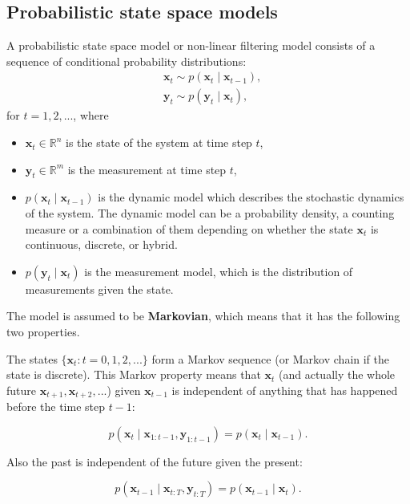 \subsection{Probabilistic state space models}
\begin{definition}
A probabilistic state space model or non-linear filtering model consists of a sequence of conditional probability distributions: 
\begin{align}
&\mathbf{x}_t \sim p(\mathbf{x}_t \mid \mathbf{x}_{t-1}), \nonumber \\
&\mathbf{y}_t \sim p(\mathbf{y}_t \mid \mathbf{x}_t),
\end{align}
for $t=1,2,...$, where 
\begin{itemize}
    \item $\mathbf{x}_t \in \mathbb{R}^n$ is the state of the system at time step $t$,
    \item $\mathbf{y}_t \in \mathbb{R}^m$ is the measurement at time step $t$, 
    \item $p(\mathbf{x}_t\mid \mathbf{x}_{t-1})$ is the dynamic model which describes the stochastic dynamics of the system. The dynamic model can be a probability density, a counting measure or a combination of them depending on whether the state $\mathbf{x}_t$ is continuous, discrete, or hybrid. 
    \item $p(\mathbf{y}_t\mid \mathbf{x}_t)$ is the measurement model, which is the distribution of measurements given the state. 
\end{itemize}
The model is assumed to be \textbf{Markovian}, which means that it has the following two properties. 
\end{definition}

\begin{property}
The states $\{\mathbf{x}_t: t = 0,1,2,...\}$ form a Markov sequence (or Markov chain if the state is discrete). This Markov property means that $\mathbf{x}_t$ (and actually the whole future $\mathbf{x}_{t+1}, \mathbf{x}_{t+2},...$) given $\mathbf{x}_{t-1}$ is independent of anything that has happened before the time step $t-1$: 

\begin{equation}\label{eq: Markov property of states}
   p(\mathbf{x}_t\mid \mathbf{x}_{1:t-1},\mathbf{y}_{1:t-1} )=  p(\mathbf{x}_t\mid \mathbf{x}_{t-1}).
\end{equation}

\noindent Also the past is independent of the future given the present: 

\begin{equation}
   p(\mathbf{x}_{t-1}\mid \mathbf{x}_{t:T},\mathbf{y}_{t:T} )=  p(\mathbf{x}_{t-1}\mid \mathbf{x}_t).
\end{equation}
\end{property}

